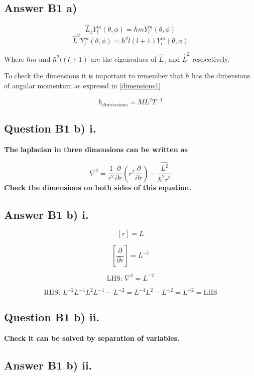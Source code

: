 \documentclass[12pt]{article}
\begin{document}
\subsection*{Answer B1 a)}

$$\hat{L}_{z}Y_{l}^{m}(\theta,\phi)=\hbar m Y_{l}^{m}(\theta,\phi)$$
$$\hat{L}^{2}Y_{l}^{m}(\theta,\phi)=\hbar^{2}l(l+1)Y_{l}^{m}(\theta,\phi)$$

Where $\hbar m$ and $\hbar^{2}l(l+1)$ are the eigenvalues of $\hat{L}_{z}$ and $\hat{L}^{2}$ respectively.

To check the dimensions it is important to remember that $\hbar$ has the dimensions of angular momentum as expressd in \cref{dimensions1}

\begin{equation}
\label{eq:dimensions1}
\hbar_{dimensions}=ML^{2}T^{-1}  
\end{equation}
\clearpage
\subsection*{Question B1 b) i.}
\textbf{The laplacian in three dimensions can be written as}

\begin{equation}
\label{eq:lap}
\nabla^{2}=\frac{1}{r^{2}}\frac{\partial}{\partial{r}} \left(r^{2 }\frac{\partial}{\partial{r}}\right)-\frac{\hat{L^{2}}}{\hbar^{2} r^{2}}
\end{equation}
\noindent
\textbf{Check the dimensions on both sides of this equation.}

\subsection*{Answer B1 b) i.}
$$[r]=L$$

$$\left[\frac{\partial}{\partial{r}}\right]=L^{-1}$$

$$\text{LHS: }\nabla^{2}=L^{-2}$$

$$\text{RHS: }L^{-2}L^{-1}L^{2}L^{-1}-L^{-2}=L^{-4}L^{2}-L^{-2}=L^{-2}=\text{LHS}$$
\clearpage
\subsection*{Question B1 b) ii.}

\textbf{Check it can be solved by separation of variables.}

\subsection*{Answer B1 b) ii.}
\end{document}
